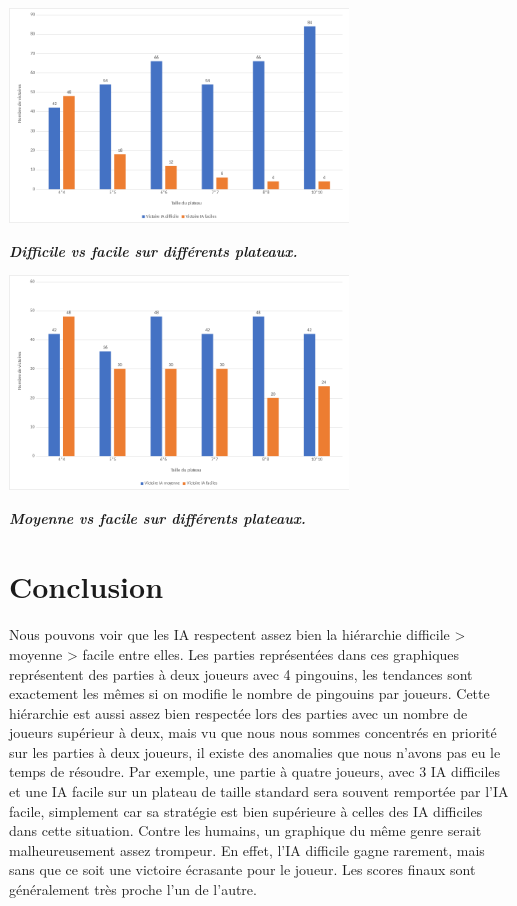 \documentclass{report}
\begin{document}
\begin{center}
  \includegraphics[width=9cm]{graph1.png}
\end{center} 
\textbf{\textit{Difficile vs facile sur différents plateaux.}}
\begin{center}
  \includegraphics[width=9cm]{graph2.png}
\end{center}
\textbf{\textit{Moyenne vs facile sur différents plateaux.}}
\chapter{Conclusion}

Nous pouvons voir que les IA respectent assez bien la hiérarchie difficile > moyenne > facile entre elles. 
Les parties représentées dans ces graphiques représentent des parties à deux joueurs avec 4 pingouins, les tendances sont exactement les mêmes si on modifie le nombre de pingouins par joueurs.
Cette hiérarchie est aussi assez bien respectée lors des parties avec un nombre de joueurs supérieur à deux, mais vu que nous nous sommes concentrés en priorité sur les parties à deux joueurs, il existe des anomalies que nous n'avons pas eu le temps de résoudre.
\newline
Par exemple, une partie à quatre joueurs, avec 3 IA difficiles et une IA facile sur un plateau de taille standard sera souvent remportée par l'IA facile, simplement car sa stratégie est bien supérieure à celles des IA difficiles dans cette situation.
\newline
Contre les humains, un graphique du même genre serait malheureusement assez trompeur. En effet, l'IA difficile gagne rarement, mais sans que ce soit une victoire écrasante pour le joueur. Les scores finaux sont généralement très proche l'un de l'autre.
\end{document}
